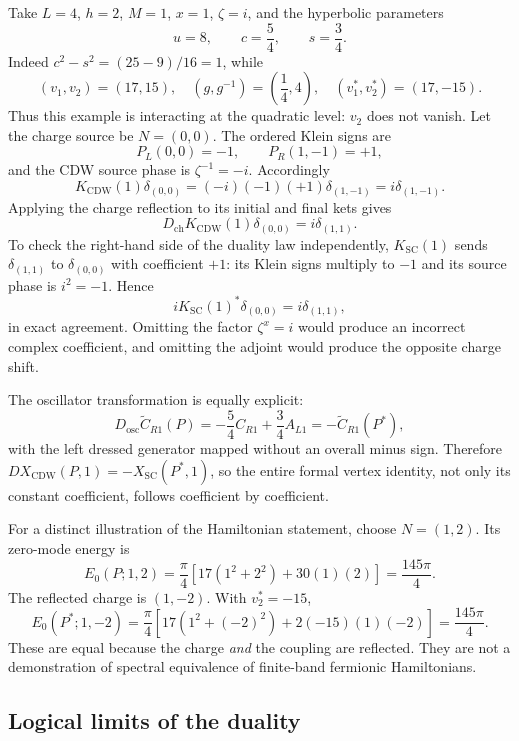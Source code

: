 \begin{example}
\label{ex:ch20c-L4}
Take $L=4$, $h=2$, $M=1$, $x=1$, $\zeta=i$, and the hyperbolic
parameters
\[
 u=8,\qquad c=\frac54,\qquad s=\frac34.
\]
Indeed $c^2-s^2=(25-9)/16=1$, while
\[
 (v_1,v_2)=(17,15),\quad
 (g,g^{-1})=\left(\frac14,4\right),\quad
 (v_1^*,v_2^*)=(17,-15).
\]
Thus this example is interacting at the quadratic level: $v_2$
does not vanish.  Let the charge source be $N=(0,0)$.
The ordered Klein signs are
\[
 P_L(0,0)=-1,\qquad P_R(1,-1)=+1,
\]
and the CDW source phase is $\zeta^{-1}=-i$.  Accordingly
\[
 K_{\mathrm{CDW}}(1)\delta_{(0,0)}
 =(-i)(-1)(+1)\delta_{(1,-1)}
 =i\delta_{(1,-1)}.
\]
Applying the charge reflection to its initial and final kets gives
\[
 D_{\mathrm{ch}}K_{\mathrm{CDW}}(1)\delta_{(0,0)}
  =i\delta_{(1,1)}.
\]
To check the right-hand side of the duality law independently,
$K_{\mathrm{SC}}(1)$ sends $\delta_{(1,1)}$ to
$\delta_{(0,0)}$ with coefficient $+1$: its Klein signs multiply
to $-1$ and its source phase is $i^{2}=-1$.  Hence
\[
 iK_{\mathrm{SC}}(1)^*\delta_{(0,0)}
 =i\delta_{(1,1)},
\]
in exact agreement.  Omitting the factor $\zeta^x=i$ would
produce an incorrect complex coefficient, and omitting the adjoint
would produce the opposite charge shift.

The oscillator transformation is equally explicit:
\[
 D_{\mathrm{osc}}\widetilde C_{R1}(P)
 =-\frac54 C_{R1}+\frac34 A_{L1}
 =-\widetilde C_{R1}(P^*),
\]
with the left dressed generator mapped without an overall minus
sign.  Therefore
\(D X_{\mathrm{CDW}}(P,1)=-X_{\mathrm{SC}}(P^*,1)\),
so the entire formal vertex identity, not only its constant
coefficient, follows coefficient by coefficient.

For a distinct illustration of the Hamiltonian statement, choose
$N=(1,2)$.  Its zero-mode energy is
\[
 E_0(P;1,2)
 =\frac\pi4[17(1^2+2^2)+30(1)(2)]
 =\frac{145\pi}{4}.
\]
The reflected charge is $(1,-2)$.  With $v_2^*=-15$,
\[
 E_0(P^*;1,-2)
 =\frac\pi4[17(1^2+(-2)^2)+2(-15)(1)(-2)]
 =\frac{145\pi}{4}.
\]
These are equal because the charge \emph{and} the coupling are
reflected.  They are not a demonstration of spectral equivalence of
finite-band fermionic Hamiltonians.
\end{example}

\subsection{Logical limits of the duality}
\label{subsec:ch20c-limits}

